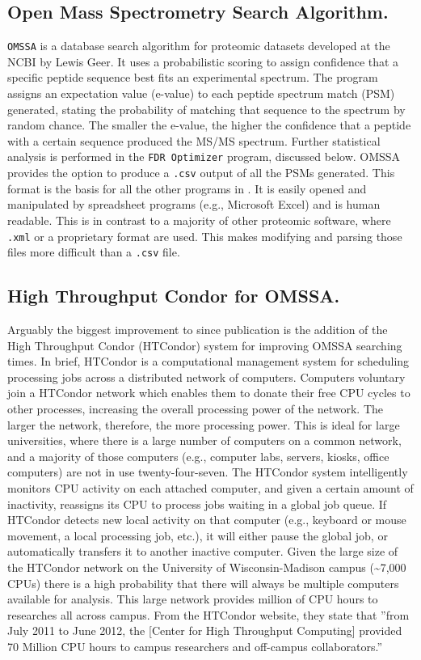 \subsection*{Open Mass Spectrometry Search Algorithm.}
\texttt{OMSSA} is a database search algorithm for proteomic datasets developed at the NCBI by Lewis Geer.\cite{omssa} It uses a probabilistic scoring to assign confidence that a specific peptide sequence best fits an experimental spectrum. The program assigns an expectation value (e-value) to each peptide spectrum match (PSM) generated, stating the probability of matching that sequence to the spectrum by random chance. The smaller the e-value, the higher the confidence that a peptide with a certain sequence produced the MS/MS spectrum. Further statistical analysis is performed in the \texttt{FDR Optimizer} program, discussed below. OMSSA provides the option to produce a \texttt{.csv} output of all the PSMs generated. This format is the basis for all the other programs in \compass{}. It is easily opened and manipulated by spreadsheet programs (e.g., Microsoft Excel) and is human readable. This is in contrast to a majority of other proteomic software, where \texttt{.xml} or a proprietary format are used. This makes modifying and parsing those files more difficult than a \texttt{.csv} file.

\subsection*{High Throughput Condor for OMSSA.}
Arguably the biggest improvement to \compass{} since publication is the addition of the High Throughput Condor (HTCondor) system for improving OMSSA searching times. In brief, HTCondor is a computational management system for scheduling processing jobs across a distributed network of computers. Computers voluntary join a HTCondor network which enables them to donate their free CPU cycles to other processes, increasing the overall processing power of the network. The larger the network, therefore, the more processing power. This is ideal for large universities, where there is a large number of computers on a common network, and a majority of those computers (e.g., computer labs, servers, kiosks, office computers) are not in use twenty-four-seven. The HTCondor system intelligently monitors CPU activity on each attached computer, and given a certain amount of inactivity, reassigns its CPU to process jobs waiting in a global job queue. If HTCondor detects new local activity on that computer (e.g., keyboard or mouse movement, a local processing job, etc.), it will either pause the global job, or automatically transfers it to another inactive computer. Given the large size of the HTCondor network on the University of Wisconsin-Madison campus (\textasciitilde7,000 CPUs) there is a high probability that there will always be multiple computers available for analysis. This large network provides million of CPU hours to researches all across campus. From the HTCondor website, they state that ''from July 2011 to June 2012, the [Center for High Throughput Computing] provided 70 Million CPU hours to campus researchers and off-campus collaborators.''

